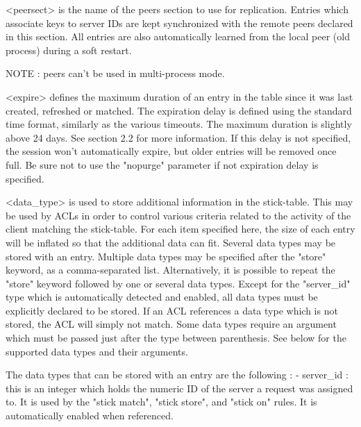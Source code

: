     <peersect> is the name of the peers section to use for replication. Entries
               which associate keys to server IDs are kept synchronized with
               the remote peers declared in this section. All entries are also
               automatically learned from the local peer (old process) during a
               soft restart.

               NOTE : peers can't be used in multi-process mode.

    <expire>   defines the maximum duration of an entry in the table since it
               was last created, refreshed or matched. The expiration delay is
               defined using the standard time format, similarly as the various
               timeouts. The maximum duration is slightly above 24 days. See
               section 2.2 for more information. If this delay is not specified,
               the session won't automatically expire, but older entries will
               be removed once full. Be sure not to use the "nopurge" parameter
               if not expiration delay is specified.

   <data_type> is used to store additional information in the stick-table. This
               may be used by ACLs in order to control various criteria related
               to the activity of the client matching the stick-table. For each
               item specified here, the size of each entry will be inflated so
               that the additional data can fit. Several data types may be
               stored with an entry. Multiple data types may be specified after
               the "store" keyword, as a comma-separated list. Alternatively,
               it is possible to repeat the "store" keyword followed by one or
               several data types. Except for the "server_id" type which is
               automatically detected and enabled, all data types must be
               explicitly declared to be stored. If an ACL references a data
               type which is not stored, the ACL will simply not match. Some
               data types require an argument which must be passed just after
               the type between parenthesis. See below for the supported data
               types and their arguments.

  The data types that can be stored with an entry are the following :
    - server_id : this is an integer which holds the numeric ID of the server a
      request was assigned to. It is used by the "stick match", "stick store",
      and "stick on" rules. It is automatically enabled when referenced.

